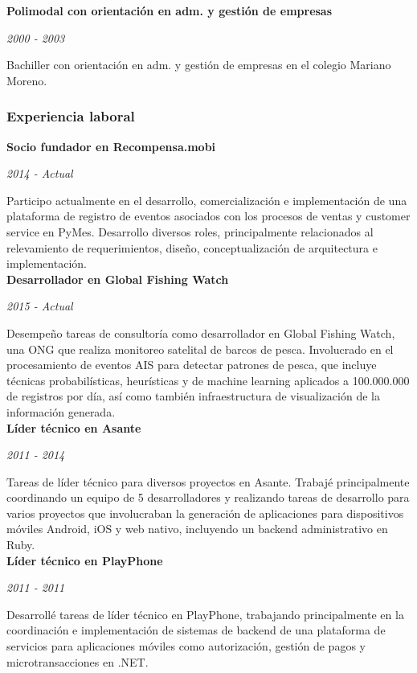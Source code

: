\documentclass[a4paper,11pt]{article}
\begin{document}
\noindent \textbf{Polimodal con orientación en adm. y gestión de empresas}

\noindent\emph{2000 - 2003}

\noindent Bachiller con orientación en adm. y gestión de empresas en el colegio
Mariano Moreno.

\subsubsection{Experiencia laboral}

\noindent \textbf{Socio fundador en Recompensa.mobi}

\noindent \emph{2014 - Actual}

\noindent Participo actualmente en el desarrollo, comercialización e
implementación de una plataforma de registro de eventos asociados con los
procesos de ventas y customer service en PyMes. Desarrollo diversos roles,
principalmente relacionados al relevamiento de requerimientos, diseño,
conceptualización de arquitectura e implementación. \\

\noindent \textbf{Desarrollador en Global Fishing Watch}

\noindent \emph{2015 - Actual}

\noindent Desempeño tareas de consultoría como desarrollador en Global Fishing
Watch, una ONG que realiza monitoreo satelital de barcos de pesca. Involucrado
en el procesamiento de eventos AIS para detectar patrones de pesca, que incluye
técnicas probabilísticas, heurísticas y de machine learning aplicados a
100.000.000 de registros por día, así como también infraestructura de
visualización de la información generada. \\

\noindent \textbf{Líder técnico en Asante}

\noindent \emph{2011 - 2014}

\noindent Tareas de líder técnico para diversos proyectos en Asante. Trabajé
principalmente coordinando un equipo de 5 desarrolladores y realizando tareas
de desarrollo para varios proyectos que involucraban la generación de
aplicaciones para dispositivos móviles Android, iOS y web nativo, incluyendo un
backend administrativo en Ruby. \\

\noindent \textbf{Líder técnico en PlayPhone}

\noindent \emph{2011 - 2011}

\noindent Desarrollé tareas de líder técnico en PlayPhone, trabajando
principalmente en la coordinación e implementación de sistemas de backend de
una plataforma de servicios para aplicaciones móviles como autorización,
gestión de pagos y microtransacciones en .NET. \\
\end{document}

